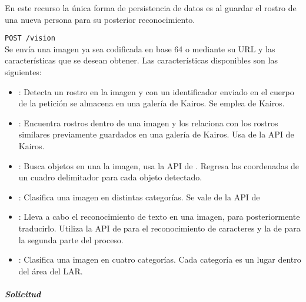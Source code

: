 En este recurso la única forma de persistencia de datos es al guardar el
rostro de una nueva persona para su posterior reconocimiento.


\texttt{POST /vision}
\label{\detokenize{chapter_two/desc_cloudnao:post-vision}}\\

Se envía una imagen ya sea codificada en base 64 o mediante su URL y
las características que se desean obtener. Las características disponibles
son las siguientes:

\begin{itemize}
    \item{}
    :
Detecta un rostro en la imagen y
con un identificador enviado en
el cuerpo de la petición se
almacena en una galería de
Kairos. Se emplea
de Kairos.
\item{}
:
Encuentra rostros dentro de una
imagen y los relaciona con los
rostros similares previamente
guardados en una galería de
Kairos. Usa
de la API de Kairos.
\item{}
:
Busca objetos en una la imagen,
usa la API de .
Regresa las coordenadas de un
cuadro delimitador para cada
objeto detectado.
\item{}
:
Clasifica una imagen en distintas
categorías. Se vale de la API de
\item{}
:
Lleva a cabo el reconocimiento de
texto en una imagen, para
posteriormente traducirlo.
Utiliza la API de 
para el reconocimiento de
caracteres y la de 
para la segunda parte del proceso.
\item{}
:
Clasifica una imagen en cuatro
categorías. Cada categoría es un
lugar dentro del área del LAR.

\end{itemize}


\subparagraph{Solicitud}
\label{\detokenize{chapter_two/desc_cloudnao:peticion}}

